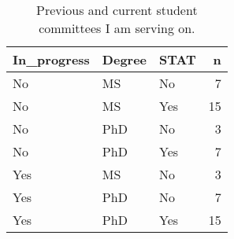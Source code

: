 \begin{table}[h]
\centering
\begin{tabular}{lllr}
  \hline
In\_progress & Degree & STAT & n \\ 
  \hline
No & MS & No &   7 \\ 
  No & MS & Yes &  15 \\ 
  No & PhD & No &   3 \\ 
  No & PhD & Yes &   7 \\ 
  Yes & MS & No &   3 \\ 
  Yes & PhD & No &   7 \\ 
  Yes & PhD & Yes &  15 \\ 
   \hline
\end{tabular}
\caption{Previous and current student committees I am serving on.} 
\label{tab:committees}
\end{table}
